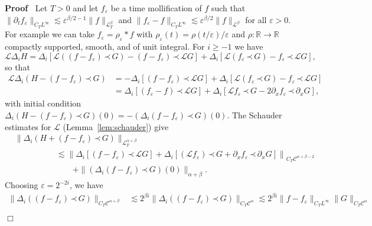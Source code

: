 \documentclass[a4paper,11pt]{article}
\newcommand{\upl}{+}
\newenvironment{proof}{\noindent\textbf{Proof\ }}{\hspace*{\fill}$\Box$\medskip}
\newcommand{\LL}{\mathscr{L}}
\newcommand{\CC}{\mathscr{C}}
\newcommand{\lpara}{\,\mathord{\prec}\,}
\begin{document}
\begin{proof}
  Let $T > 0$ and let $f_{\varepsilon}$ be a time mollification of $f$ such
  that $\| \partial_t f_{\varepsilon} \|_{C_T L^{\infty}} \lesssim
  \varepsilon^{\beta / 2 - 1} \| f \|_{\LL^{\beta}_T}$ and $\| f_{\varepsilon}
  - f \|_{C_T L^{\infty}} \lesssim \varepsilon^{\beta / 2} \| f
  \|_{\LL^{\beta}}$ for all $\varepsilon > 0$. For example we can take
  $f_{\varepsilon} = \rho_{\varepsilon} \ast f$ with $\rho_{\varepsilon} (t) =
  \rho (t / \varepsilon) / \varepsilon$ and $\rho : \mathbb{R} \rightarrow
  \mathbb{R}$ compactly supported, smooth, and of unit integral. For $i
  \geqslant - 1$ we have
  \[ \LL \Delta_i H = \Delta_i \left[ \LL ((f - f_{\varepsilon}) \lpara G) - (f
     - f_{\varepsilon}) \lpara \LL G \right] + \Delta_i \left[ \LL
     (f_{\varepsilon} \lpara G) - f_{\varepsilon} \lpara \LL G \right], \]
  so that
  \begin{align*}
      \LL \Delta_i (H - (f - f_{\varepsilon}) \lpara G) & = - \Delta_i \left[ (f - f_{\varepsilon}) \lpara \LL G \right] + \Delta_i \left[ \LL(f_{\varepsilon} \lpara G) - f_{\varepsilon} \lpara \LL G \right] \\
      & = \Delta_i \left[ (f_{\varepsilon} - f) \lpara \LL G \right] + \Delta_i \left[ \LL f_{\varepsilon} \lpara G - 2 \partial_x f_{\varepsilon} \lpara \partial_x G \right],
  \end{align*}
  with initial condition $\Delta_i (H - (f - f_{\varepsilon}) \lpara G) (0) = -
  (\Delta_i (f - f_{\varepsilon}) \lpara G) (0)$. The Schauder estimates for
  $\LL$ (Lemma~\ref{lem:schauder}) give
  \begin{align*}
      &\| \Delta_i (H + (f - f_{\varepsilon}) \lpara G) \|_{\LL^{\alpha \upl \beta}_T} \\
      &\hspace{60pt} \lesssim \left\| \Delta_i \left[ (f - f_{\varepsilon}) \lpara \LL G \right] + \Delta_i \left[ \left( \LL f_{\varepsilon} \right) \lpara G + \partial_x f_{\varepsilon} \lpara \partial_x G \right] \right\|_{C_T \CC^{\alpha + \beta - 2}} \\
      &\hspace{60pt} \qquad + \| (\Delta_i (f - f_{\varepsilon}) \lpara G) (0) \|_{\alpha + \beta} .
  \end{align*}
  Choosing $\varepsilon = 2^{- 2 i}$, we have
  \begin{align*}
     \| \Delta_i ((f - f_{\varepsilon}) \lpara G) \|_{C_T \CC^{\alpha + \beta}} & \lesssim 2^{\beta i} \| \Delta_i ((f - f_{\varepsilon}) \lpara G) \|_{C_T \CC^{\alpha}} \lesssim 2^{\beta i} \| f - f_{\varepsilon} \|_{C_T L^{\infty}} \| G \|_{C_T \CC^{\alpha}} \\

\end{align*}
\end{proof}
\end{document}
